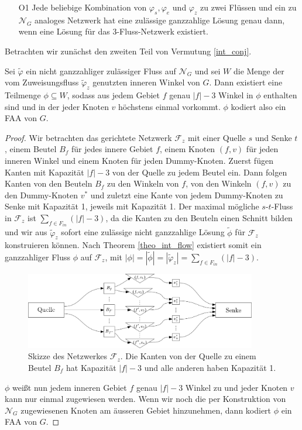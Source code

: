 \begin{itemize}
\item [O1] Jede beliebige Kombination von $\varphi_s,\varphi_e$ und $\varphi_z$ zu zwei Flüssen und ein zu $\mathcal{N}_G$ analoges Netzwerk hat eine zulässige ganzzahlige Lösung genau dann, wenn eine Lösung für das 3-Fluss-Netzwerk existiert.
\end{itemize}

Betrachten wir zunächst den zweiten Teil von Vermutung \ref{int_conj}.

\begin{lemma}\label{lem_faa}
Sei $\tilde{\varphi}$ ein nicht ganzzahliger zulässiger Fluss auf $\mathcal{N}_G$ und sei $W$ die Menge der vom Zuweisungsfluss $\tilde{\varphi}_z$ genutzten inneren Winkel von $G$. Dann existiert eine Teilmenge $\phi\subseteq W$, sodass aus jedem Gebiet $f$ genau $|f|-3$ Winkel in $\phi$ enthalten sind und in der jeder Knoten $v$ höchstens einmal vorkommt. $\phi$ kodiert also ein FAA von $G$.
\end{lemma}

\begin{proof}
Wir betrachten das gerichtete Netzwerk $\mathcal{F}_z$ mit einer Quelle $s$ und Senke $t$, einem Beutel $B_f$ für jedes innere Gebiet $f$, einem Knoten $(f,v)$ für jeden inneren Winkel und einem Knoten für jeden Dummy-Knoten. Zuerst fügen Kanten mit Kapazität $|f|-3$ von der Quelle zu jedem Beutel ein. Dann folgen Kanten von den Beuteln $B_f$ zu den Winkeln von $f$, von den Winkeln $(f,v)$ zu den Dummy-Knoten $v^*$ und zuletzt eine Kante von jedem Dummy-Knoten zu Senke mit Kapazität 1, jeweils mit Kapazität 1. Der maximal mögliche $s$-$t$-Fluss in $\mathcal{F}_z$ ist $\sum_{f \in F_{in}}(|f|-3)$, da die Kanten zu den Beuteln einen Schnitt bilden und wir  aus $\tilde{\varphi}_z$ sofort eine zulässige nicht ganzzahlige Lösung $\tilde{\phi}$ für $\mathcal{F}_z$ konstruieren können. Nach Theorem \ref{theo_int_flow} existiert somit ein ganzzahliger Fluss $\phi$ auf $\mathcal{F}_z$, mit $|\phi| = |\tilde{\phi}| = |\tilde{\varphi}_z| = \sum_{f \in F_{in}}(|f|-3).$

\begin{figure}
	\centering
  	\includegraphics[width=0.9\textwidth]{lem_faa_choice.png}
  	\caption{Skizze des Netzwerkes $\mathcal{F}_z$. Die Kanten von der Quelle zu einem Beutel $B_f$ hat Kapazität $|f|-3$ und alle anderen haben Kapazität 1.}
\end{figure}

$\phi$ weißt nun jedem inneren Gebiet $f$ genau $|f|-3$ Winkel zu und jeder Knoten $v$ kann nur einmal zugewiesen werden. Wenn wir noch die per Konstruktion von $\mathcal{N}_G$ zugewiesenen Knoten am äusseren Gebiet hinzunehmen, dann kodiert $\phi$ ein FAA von $G$.
\end{proof}


